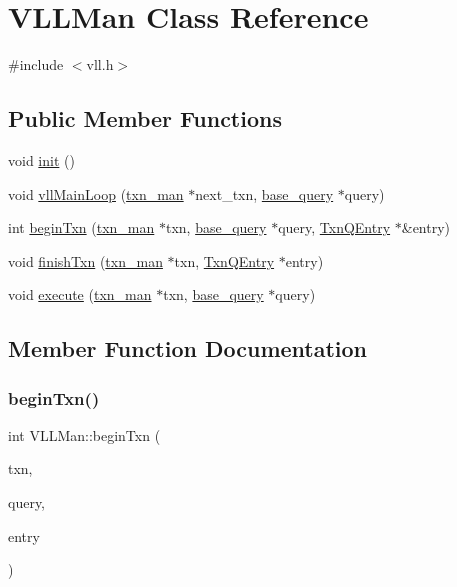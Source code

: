 \hypertarget{classVLLMan}{}\section{V\+L\+L\+Man Class Reference}
\label{classVLLMan}


{\ttfamily \#include $<$vll.\+h$>$}

\subsection*{Public Member Functions}
\begin{DoxyCompactItemize}
\item 
void \hyperlink{classVLLMan_a598c042910b0fc6dff90141de1fbc89b}{init} ()
\item 
void \hyperlink{classVLLMan_a3c4fb364b0a0af7d38ee00d846b3524a}{vll\+Main\+Loop} (\hyperlink{classtxn__man}{txn\+\_\+man} $\ast$next\+\_\+txn, \hyperlink{classbase__query}{base\+\_\+query} $\ast$query)
\item 
int \hyperlink{classVLLMan_aed7e1d48a7510cfc25c35d82db547746}{begin\+Txn} (\hyperlink{classtxn__man}{txn\+\_\+man} $\ast$txn, \hyperlink{classbase__query}{base\+\_\+query} $\ast$query, \hyperlink{classTxnQEntry}{Txn\+Q\+Entry} $\ast$\&entry)
\item 
void \hyperlink{classVLLMan_a7366863b5f2b9158d022344be487cb5e}{finish\+Txn} (\hyperlink{classtxn__man}{txn\+\_\+man} $\ast$txn, \hyperlink{classTxnQEntry}{Txn\+Q\+Entry} $\ast$entry)
\item 
void \hyperlink{classVLLMan_a766e95fdf411e87dcbde34940ef98ce1}{execute} (\hyperlink{classtxn__man}{txn\+\_\+man} $\ast$txn, \hyperlink{classbase__query}{base\+\_\+query} $\ast$query)
\end{DoxyCompactItemize}


\subsection{Member Function Documentation}
\mbox{\label{classVLLMan_aed7e1d48a7510cfc25c35d82db547746}} 
\subsubsection{\texorpdfstring{begin\+Txn()}{beginTxn()}}
{\footnotesize\ttfamily int V\+L\+L\+Man\+::begin\+Txn (\begin{DoxyParamCaption}\item[{\hyperlink{classtxn__man}{txn\+\_\+man} $\ast$}]{txn,  }\item[{\hyperlink{classbase__query}{base\+\_\+query} $\ast$}]{query,  }\item[{\hyperlink{classTxnQEntry}{Txn\+Q\+Entry} $\ast$\&}]{entry }\end{DoxyParamCaption})}

